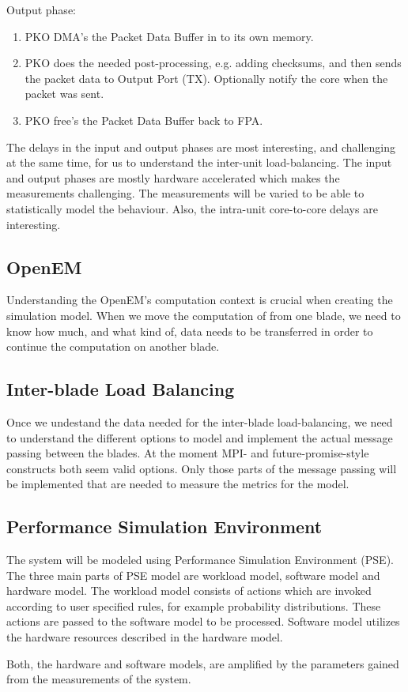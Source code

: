 Output phase:
\begin{enumerate}
\item PKO DMA's the Packet Data Buffer in to its own memory.
\item PKO does the needed post-processing, e.g. adding checksums, and then sends the packet data to Output Port (TX). Optionally notify the core when the packet was sent.
\item PKO free's the Packet Data Buffer back to FPA.
\end{enumerate}

The delays in the input and output phases are most interesting, and challenging at the same time, for us to understand the inter-unit load-balancing. The input and output phases are mostly hardware accelerated which makes the measurements challenging. The measurements will be varied to be able to statistically model the behaviour. Also, the intra-unit core-to-core delays are interesting.

\subsection{OpenEM}
Understanding the OpenEM's computation context is crucial when creating the simulation model. When we move the computation of from one blade, we need to know how much, and what kind of, data needs to be transferred in order to continue the computation on another blade.

\subsection{Inter-blade Load Balancing}
Once we undestand the data needed for the inter-blade load-balancing, we need to understand the different options to model and implement the actual message passing between the blades. At the moment MPI- and future-promise-style constructs both seem valid options. Only those parts of the message passing will be implemented that are needed to measure the metrics for the model.

\subsection{Performance Simulation Environment}
The system will be modeled using Performance Simulation Environment (PSE). The three main parts of PSE  model are workload model, software model and hardware model. The workload model consists of actions which are invoked according to user specified rules, for example probability distributions. These actions are passed to the software model to be processed. Software model utilizes the hardware resources described in the hardware model.

Both, the hardware and software models, are amplified by the parameters gained from the measurements of the system.

